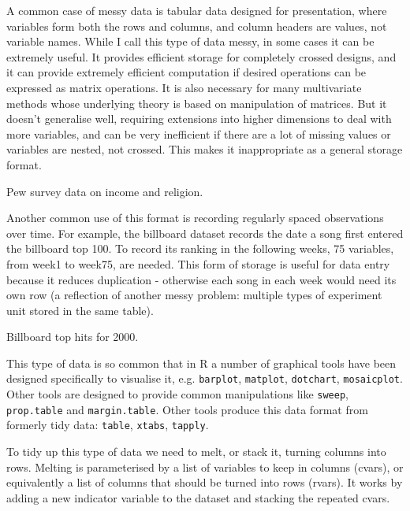 \documentclass[oneside]{article}
\begin{document}
A common case of messy data is tabular data designed for presentation, where variables form both the rows and columns, and column headers are values, not variable names. While I call this type of data messy, in some cases it can be extremely useful. It provides efficient storage for completely crossed designs, and it can provide extremely efficient computation if desired operations can be expressed as matrix operations. It is also necessary for many multivariate methods whose underlying theory is based on manipulation of matrices. But it doesn't generalise well, requiring extensions into higher dimensions to deal with more variables, and can be very inefficient if there are a lot of missing values or variables are nested, not crossed. This makes it inappropriate as a general storage format.

\begin{table}[htbp]
  \centering
  
  \caption{Pew survey data on income and religion.}
  \label{tbl:pew-raw}
\end{table}

Another common use of this format is recording regularly spaced observations over time. For example, the billboard dataset records the date a song first entered the billboard top 100. To record its ranking in the following weeks, 75 variables, from week1 to week75, are needed. This form of storage is useful for data entry because it reduces duplication - otherwise each song in each week would need its own row (a reflection of another messy problem: multiple types of experiment unit stored in the same table).

\begin{table}[htbp]
  \centering
  
  \caption{Billboard top hits for 2000.}
  \label{tbl:billboard-raw}
\end{table}

This type of data is so common that in R a number of graphical tools have been designed specifically to visualise it, e.g. {\tt barplot}, {\tt matplot}, {\tt dotchart}, {\tt mosaicplot}. Other tools are designed to provide common manipulations like {\tt sweep}, {\tt prop.table} and {\tt margin.table}. Other tools produce this data format from formerly tidy data: {\tt table}, {\tt xtabs}, {\tt tapply}.

To tidy up this type of data we need to melt, or stack it, turning columns into rows. Melting is parameterised by a list of variables to keep in columns (cvars), or equivalently a list of columns that should be turned into rows (rvars). It works by adding a new indicator variable to the dataset and stacking the repeated cvars.
\end{document}
